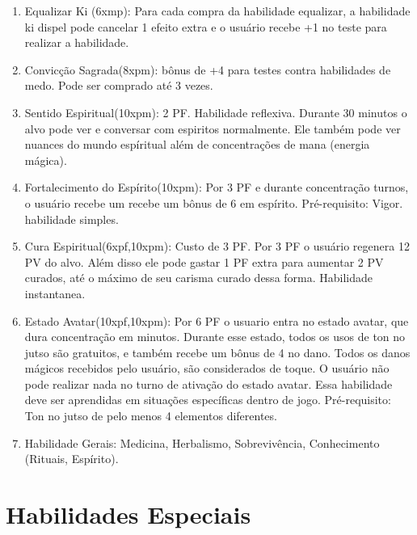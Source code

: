 \begin{enumerate}
		\item Equalizar Ki (6xmp): Para cada compra da habilidade equalizar, a habilidade ki dispel pode cancelar 1 efeito extra e o usuário recebe +1 no teste para realizar a habilidade.

\item Convicção Sagrada(8xpm): bônus de +4 para testes contra habilidades de medo. Pode ser comprado até 3 vezes.

\item Sentido Espiritual(10xpm): 2 PF. Habilidade reflexiva.\newline
Durante 30 minutos o alvo pode ver e conversar com espiritos normalmente. Ele também pode ver nuances do mundo espíritual além de concentrações de mana (energia mágica). 

\item Fortalecimento do Espírito(10xpm): Por 3 PF e durante concentração turnos, o usuário recebe um recebe um bônus de 6 em espírito. Pré-requisito: Vigor. habilidade simples.

\item Cura Espiritual(6xpf,10xpm): Custo de 3 PF.\newline
Por 3 PF o usuário regenera 12 PV do alvo. Além disso ele pode gastar 1 PF extra para aumentar 2 PV curados, até o máximo de seu carisma curado dessa forma. Habilidade instantanea.

\item Estado Avatar(10xpf,10xpm): Por 6 PF o usuario entra no estado avatar, que dura concentração em minutos. Durante esse estado, todos os usos de ton no jutso são gratuitos, e também recebe um bônus de 4 no dano. Todos os danos mágicos recebidos pelo usuário, são considerados de toque. O usuário não pode realizar nada no turno de ativação do estado avatar. Essa habilidade deve ser aprendidas em situações específicas dentro de jogo. Pré-requisito: Ton no jutso de pelo menos 4 elementos diferentes.




\item Habilidade Gerais: Medicina, Herbalismo, Sobrevivência, Conhecimento (Rituais, Espírito).


\end{enumerate}

\section{Habilidades Especiais}

